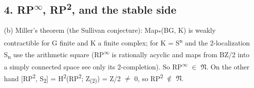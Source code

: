 \subsection*{4. RP\textsuperscript{\ensuremath{\infty}}, RP\textsuperscript{2}, and the stable side}

(b) Miller's theorem (the Sullivan conjecture): Map\textsubscript{*}(BG, K) is weakly contractible for G finite and K a finite complex; for K = S\textsuperscript{n} and the 2-localization S\textsubscript{n} use the arithmetic square (RP\textsuperscript{\ensuremath{\infty}} is rationally acyclic and maps from BZ/2 into a simply connected space see only its 2-completion). So RP\textsuperscript{\ensuremath{\infty}} \ensuremath{\in} \ensuremath{\mathfrak N}. On the other hand [RP\textsuperscript{2}, S\textsubscript{2}] = H\textsuperscript{2}(RP\textsuperscript{2}; Z\textsubscript{(2)}) = Z/2 \ensuremath{\ne} 0, so RP\textsuperscript{2} \ensuremath{\notin} \ensuremath{\mathfrak N}.

